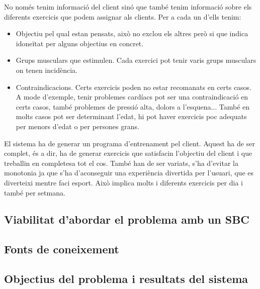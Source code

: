 No només tenim informació del client sinó que també tenim informació sobre els diferents exercicis que podem assignar als clients. Per a cada un d'ells tenim:

\begin{itemize}
    \item Objectiu pel qual estan pensats, això no exclou els altres però si que indica idoneïtat per alguns objectius en concret.
    \item Grups musculars que estimulen. Cada exercici pot tenir varis grups musculars on tenen incidència.
    \item Contraindicacions. Certs exercicis poden no estar recomanats en certs casos. A mode d'exemple, tenir problemes cardíacs pot ser una contraindicació en certs casos, també problemes de pressió alta, dolors a l'esquena... També en molts casos pot ser determinant l'edat, hi pot haver exercicis poc adequats per menors d'edat o per persones grans.
    
\end{itemize}

El sistema ha de generar un programa d'entrenament pel client. Aquest ha de ser complet, és a dir, ha de generar exercicis que satisfacin l'objectiu del client i que treballin en completesa tot el cos. També han de ser variats, s'ha d'evitar la monotonia ja que s'ha d'aconseguir una experiència divertida per l'usuari, que es diverteixi mentre faci esport. Això implica molts i diferents exercicis per dia i també per setmana.

\subsection{Viabilitat d'abordar el problema amb un SBC}

\subsection{Fonts de coneixement}
\subsection{Objectius del problema i resultats del sistema}
